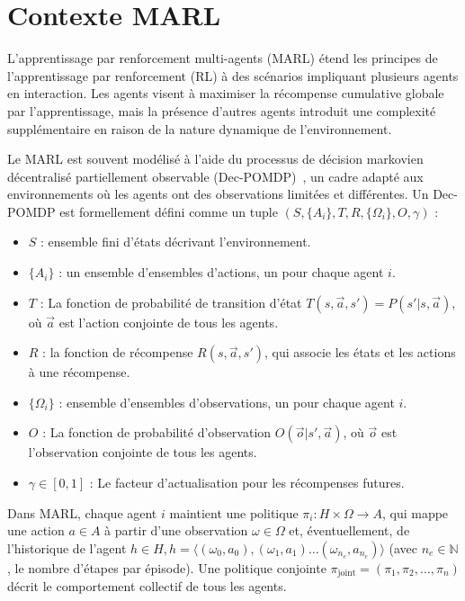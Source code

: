 \section{Contexte MARL}\label{sec:marl_background}

L'apprentissage par renforcement multi-agents (MARL) étend les principes de l'apprentissage par renforcement (RL) à des scénarios impliquant plusieurs agents en interaction. Les agents visent à maximiser la récompense cumulative globale par l'apprentissage, mais la présence d'autres agents introduit une complexité supplémentaire en raison de la nature dynamique de l'environnement.

Le MARL est souvent modélisé à l'aide du processus de décision markovien décentralisé partiellement observable (Dec-POMDP)~\cite{Beynier2013}, un cadre adapté aux environnements où les agents ont des observations limitées et différentes. Un Dec-POMDP est formellement défini comme un tuple $(S, \{A_i\}, T, R, \{\Omega_i\}, O, \gamma)$ :

\begin{itemize}
    \item $S$ : ensemble fini d'états décrivant l'environnement.
    \item $\{A_i\}$ : un ensemble d'ensembles d'actions, un pour chaque agent $i$.
    \item $T$ : La fonction de probabilité de transition d'état $T(s, \vec{a}, s') = P(s'|s, \vec{a})$, où $\vec{a}$ est l'action conjointe de tous les agents.
    \item $R$ : la fonction de récompense $R(s, \vec{a}, s')$, qui associe les états et les actions à une récompense.
    \item $\{\Omega_i\}$ : ensemble d'ensembles d'observations, un pour chaque agent $i$.
    \item $O$ : La fonction de probabilité d'observation $O(\vec{o} | s', \vec{a})$, où $\vec{o}$ est l'observation conjointe de tous les agents.
    \item $\gamma \in [0,1]$ : Le facteur d'actualisation pour les récompenses futures.
\end{itemize}

Dans MARL, chaque agent $i$ maintient une politique $\pi_i: H \times \Omega \rightarrow A$, qui mappe une action $a \in A$ à partir d'une observation $\omega \in \Omega$ et, éventuellement, de l'historique de l'agent $h \in H, h=\langle(\omega_0,a_0),(\omega_1,a_1)\dots(\omega_{n_e},a_{n_e})\rangle$ (avec $n_e \in \mathbb{N}$, le nombre d'étapes par épisode). Une politique conjointe $\pi_{\text{joint}} = (\pi_1, \pi_2, \ldots, \pi_n)$ décrit le comportement collectif de tous les agents.

